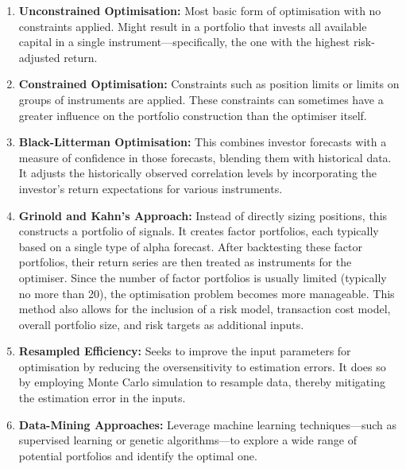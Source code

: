 \begin{method} 
\begin{enumerate}[label=\roman*.]
\setlength{\itemsep}{0pt}
\item \textbf{Unconstrained Optimisation:} Most basic form of optimisation with no constraints applied. Might result in a portfolio that invests all available capital in a single instrument—specifically, the one with the highest risk-adjusted return.
\item \textbf{Constrained Optimisation:} Constraints such as position limits or limits on groups of instruments are applied. These constraints can sometimes have a greater influence on the portfolio construction than the optimiser itself.
\item \textbf{Black-Litterman Optimisation:} This combines investor forecasts with a measure of confidence in those forecasts, blending them with historical data. It adjusts the historically observed correlation levels by incorporating the investor’s return expectations for various instruments.
\item \textbf{Grinold and Kahn's Approach:} Instead of directly sizing positions, this constructs a portfolio of signals. It creates factor portfolios, each typically based on a single type of alpha forecast. After backtesting these factor portfolios, their return series are then treated as instruments for the optimiser. Since the number of factor portfolios is usually limited (typically no more than 20), the optimisation problem becomes more manageable. This method also allows for the inclusion of a risk model, transaction cost model, overall portfolio size, and risk targets as additional inputs.
\item \textbf{Resampled Efficiency:} Seeks to improve the input parameters for optimisation by reducing the oversensitivity to estimation errors. It does so by employing Monte Carlo simulation to resample data, thereby mitigating the estimation error in the inputs.
\item \textbf{Data-Mining Approaches:} Leverage machine learning techniques—such as supervised learning or genetic algorithms—to explore a wide range of potential portfolios and identify the optimal one.
\end{enumerate}
\end{method}